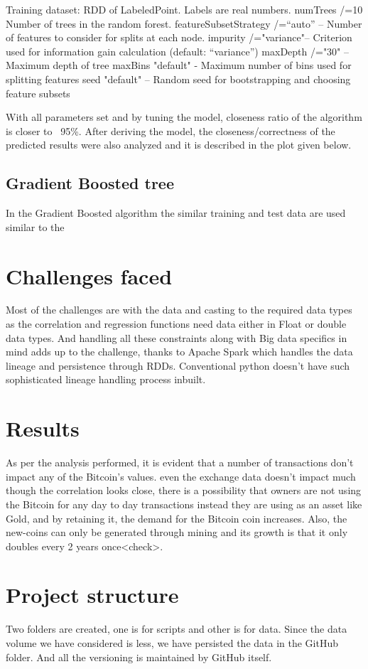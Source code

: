 \documentclass[sigconf]{acmart}
\begin{document}
Training dataset: RDD of LabeledPoint. Labels are real numbers.
numTrees /=10 Number of trees in the random forest.
featureSubsetStrategy /=“auto” – Number of features to consider for splits at each node.
impurity /="variance"– Criterion used for information gain calculation (default: “variance”)
maxDepth /="30" – Maximum depth of tree
maxBins "default" - Maximum number of bins used for splitting features
seed "default" – Random seed for bootstrapping and choosing feature subsets

With all parameters set and by tuning the model, closeness ratio of the algorithm is closer to ~95\%. After deriving the model, the closeness/correctness of the predicted results were also analyzed and it is described in the plot given below.

\subsection{Gradient Boosted tree}
In the Gradient Boosted algorithm the similar training and test data are used similar to the 



\section{Challenges faced}
Most of the challenges are with the data and casting to the required data types as the correlation and regression functions need data either in Float or double data types. And handling all these constraints along with Big data specifics in mind adds up to the challenge, thanks to Apache Spark which handles the data lineage and persistence through RDDs. Conventional python doesn't have such sophisticated lineage handling process inbuilt. 

\section{Results}
As per the analysis performed, it is evident that a number of transactions don't impact any of the Bitcoin's values. even the exchange data doesn't impact much though the correlation looks close, there is a possibility that owners are not using the Bitcoin for any day to day transactions instead they are using as an asset like Gold, and by retaining it, the demand for the Bitcoin coin increases. Also, the new-coins can only be generated through mining and its growth is that it only doubles every 2 years once<check>. 

\section{Project structure}
Two folders are created, one is for scripts and other is for data. Since the data volume we have considered is less, we have persisted the data in the GitHub folder. And all the versioning is maintained by GitHub itself.
\end{document}

